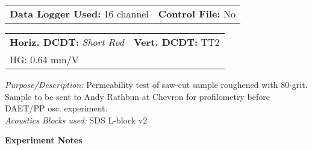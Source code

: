 \documentclass[letterpaper,10pt]{article}
\renewcommand{\arraystretch}{1.5}
\begin{document}
\renewcommand{\arraystretch}{1}
\begin{tabular}{ p{11cm} p{10cm} }
	\textbf{Data Logger Used: }16 channel &\textbf{Control File: }No  \\
\end{tabular}
\medskip 

\begin{tabular}{ p{11cm} p{10cm} }
	\textbf{Horiz. DCDT:} \textit{Short Rod} & \textbf{Vert. DCDT: }TT2 \\
	HG: 0.64 mm/V &
\end{tabular}
\medskip 

\textit{Purpose/Description: }
Permeability test of saw-cut sample roughened with 80-grit. \\ Sample to be sent to Andy Rathbun at Chevron for profilometry before DAET/PP osc. experiment. 
\\ 
 
\textit{Acoustics Blocks used: }
SDS L-block v2

\newpage 
 \textbf{Experiment Notes}
 \medskip
 \begin{itemize}[label=\#]
\end{itemize} 

 
\end{document}
